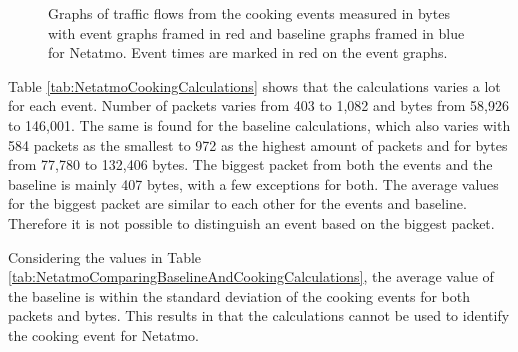 \begin{figure}[H]
\begin{subfigure}[b]{0.47\textwidth}
        \centering
    \end{subfigure}
        \begin{subfigure}[b]{0.47\textwidth}
        \centering
    \end{subfigure}
    \begin{subfigure}[b]{0.47\textwidth}
        \centering
    \end{subfigure}
    \begin{subfigure}[b]{0.47\textwidth}
        \centering
    \end{subfigure}
    \hspace{0.6cm}
    \begin{subfigure}[b]{0.47\textwidth}
    \centering
        \end{subfigure}
    \caption{Graphs of traffic flows from the cooking events measured in bytes with event graphs framed in red and baseline graphs framed in blue for Netatmo. Event times are marked in red on the event graphs.}    \label{fig:NetatmoCookingBytes2}
\end{figure}

Table \ref{tab:NetatmoCookingCalculations} shows that the calculations varies a lot for each event. Number of packets varies from 403 to 1,082 and bytes from 58,926 to 146,001. The same is found for the baseline calculations, which also varies with 584 packets as the smallest to 972 as the highest amount of packets and for bytes from 77,780 to 132,406 bytes. The biggest packet from both the events and the baseline is mainly 407 bytes, with a few exceptions for both. The average values for the biggest packet are similar to each other for the events and baseline. Therefore it is not possible to distinguish an event based on the biggest packet. 

Considering the values in Table \ref{tab:NetatmoComparingBaselineAndCookingCalculations}, the average value of the baseline is within the standard deviation of the cooking events for both packets and bytes. This results in that the calculations cannot be used to identify the cooking event for Netatmo.


